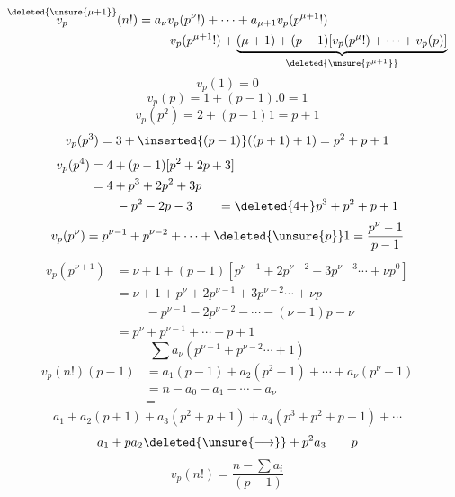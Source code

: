 \[
\begin{aligned}
\overset{\deleted{\unsure{\mu+1}}}{v_p}(n!)={}&a_\nu v_p(p^\nu!)+\cdots+a_{\mu+1}v_p(p^{\mu+1}!)\\
&-v_p(p^{\mu+1}!)+\underbrace{(\mu+1)+(p-1)[v_p(p^\mu!)+\cdots+v_p(p)]}_{\deleted{\unsure{p^{\mu+1}}}}
\end{aligned}
\]
\[
v_p(1)=0
\]
\[
v_p(p)=1+(p-1).0=1
\]
\[
v_p(p^2)=2+(p-1)1=p+1
\]
\[
v_p(p^3)=3+\inserted{(p-1)}((p+1)+1)=p^2+p+1
\]
\[
\begin{aligned}
v_p(p^4)&=4+(p-1)[p^2+2p+3]\\
&=4+p^3+2p^2+3p\\
&\phantom{={}}\quad-p^2-2p-3\qquad=\deleted{4+}p^3+p^2+p+1
\end{aligned}
\]
\[
v_p(p^\nu)=p^{\nu-1}+p^{\nu-2}+\cdots+\deleted{\unsure{p}}1=\frac{p^\nu-1}{p-1}
\]
\[
\begin{aligned}
v_p(p^{\nu+1})&=\nu+1+(p-1)[p^{\nu-1}+2p^{\nu-2}+3p^{\nu-3}\cdots+\nu p^0]\\
&=\nu+1+p^\nu+2p^{\nu-1}+3p^{\nu-2}\cdots+\nu p\\
&\phantom{={}}\quad-p^{\nu-1}-2p^{\nu-2}-\cdots-(\nu-1)p-\nu\\
&=p^\nu+p^{\nu-1}+\cdots+p+1
\end{aligned}
\]
\[
\sum a_\nu(p^{\nu-1}+p^{\nu-2}\cdots+1)
\]
\[
\begin{aligned}
v_p(n!)(p-1)&=a_1(p-1)+a_2(p^2-1)+\cdots+a_\nu(p^\nu-1)\\
&=n-a_0-a_1-\cdots-a_\nu\\
&=
\end{aligned}
\]
\[
\boxed{a_1+a_2(p+1)+a_3(p^2+p+1)+a_4(p^3+p^2+p+1)+\cdots}
\]
\[
a_1+pa_2\deleted{\unsure{\longrightarrow}}+p^2a_3\qquad p
\]
\[
\boxed{\boxed{v_p(n!)=\frac{n-\sum a_i}{(p-1)}}}
\]
